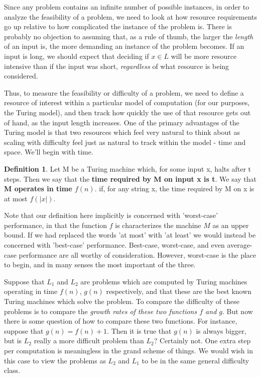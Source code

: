 \documentclass{article}
\theoremstyle{definition}
\newtheorem{definition}{Definition}[section]
\theoremstyle{plain}
\theoremstyle{theorem}
\begin{document}
Since any problem contains an infinite number of possible instances, in order to analyze the feasibility of a problem, we need to look at how resource requirements go up relative to how complicated the instance of the problem is. There is probably no objection to assuming that, as a rule of thumb, the larger the \textit{length} of an input is, the more demanding an instance of the problem becomes. If an input is long, we should expect that deciding if $x\in L$ will be more resource intensive than if the input was short, \textit{regardless} of what resource is being considered.
\par Thus, to measure the feasibility or difficulty of a problem, we need to define a resource of interest within a particular model of computation (for our purposes, the Turing model), and then track how quickly the use of that resource gets out of hand, as the input length increases. One of the primary advantages of the Turing model is that two resources which feel very natural to think about as scaling with difficulty feel just as natural to track within the model - time and space. We'll begin with time.
\begin{definition}
Let M be a Turing machine which, for some input x, halts after t steps. Then we say that the \textbf{time required by M on input x is t}. We say that \textbf{M operates in time $f(n)$}. if, for any string x, the time required by M on x is at most $f(|x|)$. 
\end{definition}
Note that our definition here implicitly is concerned with 'worst-case' performance, in that the function $f$ is characterizes the machine $M$ as an upper bound. If we had replaced the words 'at most' with 'at least' we would instead be concerned with 'best-case' performance. Best-case, worst-case, and even average-case performance are all worthy of consideration. However, worst-case is the place to begin, and in many senses the most important of the three. \par 
Suppose that $L_1$ and $L_2$ are problems which are computed by Turing machines operating in time $f(n)$, $g(n)$ respectively, and that these are the best known Turing machines which solve the problem. To compare the difficulty of these problems is to compare the \textit{growth rates of these two functions $f$ and $g$}. But now there is some question of how to compare these two functions. For instance, suppose that $g(n) = f(n)+1$. Then it is true that $g(n)$ is always bigger, but is $L_2$ really a more difficult problem than $L_2$? Certainly not. One extra step per computation is meaningless in the grand scheme of things. We would wish in this case to view the problems as $L_2$ and $L_1$ to be in the same general difficulty class. 
\end{document}
